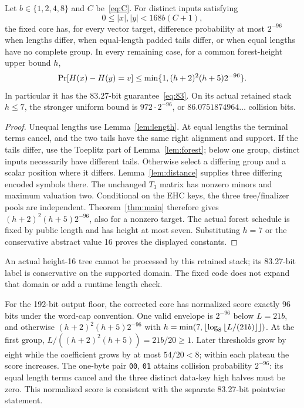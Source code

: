 \begin{theorem}\label{thm:fixed}
Let $b\in\{1,2,4,8\}$ and $C$ be~\eqref{eq:C}. For distinct inputs satisfying
\[
 0\le |x|,|y|<168b(C+1),
\]
the fixed core has, for every vector target, difference probability at most $2^{-96}$ when lengths differ, when equal-length padded tails differ, or when equal lengths have no complete group. In every remaining case, for a common forest-height upper bound $h$,
\begin{equation}\label{eq:fixed}
 \mathop{\rm Pr}[H(x)-H(y)=v]\le\min\{1,(h+2)^2(h+5)2^{-96}\}.
\end{equation}
In particular it has the $83.27$-bit guarantee~\eqref{eq:83}. On its actual retained stack $h\le7$, the stronger uniform bound is $972\cdot2^{-96}$, or $86.0751874964\ldots$ collision bits.
\end{theorem}
\begin{proof}
Unequal lengths use Lemma~\ref{lem:length}. At equal lengths the terminal terms cancel, and the two tails have the same right alignment and support. If the tails differ, use the Toeplitz part of Lemma~\ref{lem:forest}; below one group, distinct inputs necessarily have different tails. Otherwise select a differing group and a scalar position where it differs. Lemma~\ref{lem:distance} supplies three differing encoded symbols there. The unchanged $T_3$ matrix has nonzero minors and maximum valuation two. Conditional on the EHC keys, the three tree/finalizer pools are independent. Theorem~\ref{thm:main} therefore gives $(h+2)^2(h+5)2^{-96}$, also for a nonzero target. The actual forest schedule is fixed by public length and has height at most seven. Substituting $h=7$ or the conservative abstract value 16 proves the displayed constants.
\end{proof}
An actual height-16 tree cannot be processed by this retained stack; its 83.27-bit label is conservative on the supported domain. The fixed code does not expand that domain or add a runtime length check.

For the 192-bit output floor, the corrected core has normalized score exactly 96 bits under the word-cap convention. One valid envelope is $2^{-96}$ below $L=21b$, and otherwise $(h+2)^2(h+5)2^{-96}$ with $h=\min(7,\left\lfloor\log_8\left\lfloor L/(21b)\right\rfloor\right\rfloor)$. At the first group, $L/((h+2)^2(h+5))=21b/20\ge1$. Later thresholds grow by eight while the coefficient grows by at most $54/20<8$; within each plateau the score increases. The one-byte pair \texttt{00}, \texttt{01} attains collision probability $2^{-96}$: its equal length terms cancel and the three distinct data-key high halves must be zero. This normalized score is consistent with the separate 83.27-bit pointwise statement.


